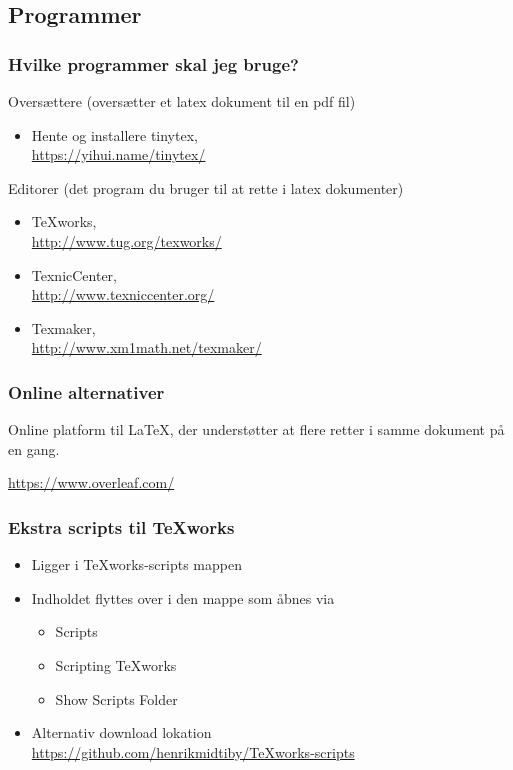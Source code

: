 \documentclass{beamer}
\begin{document}
\subsection{Programmer}
\frame
{
	\frametitle{Hvilke programmer skal jeg bruge?}
	Oversættere (oversætter et latex dokument til en pdf fil)
	\begin{itemize}
		\item Hente og installere tinytex, \\
			{\tiny \url{https://yihui.name/tinytex/}}
	\end{itemize}

	Editorer (det program du bruger til at rette i latex dokumenter)
	\begin{itemize}
		\item	TeXworks, \\
			{\tiny \url{http://www.tug.org/texworks/}}
		\item	TexnicCenter, \\
			{\tiny \url{http://www.texniccenter.org/}}
		\item 	Texmaker, \\
			{\tiny \url{http://www.xm1math.net/texmaker/}}
	\end{itemize}
}


\frame
{
	\frametitle{Online alternativer}

	Online platform til LaTeX, der understøtter at flere retter i samme dokument på en gang.

	\url{https://www.overleaf.com/}
}

\frame
{
	\frametitle{Ekstra scripts til TeXworks}
		
	\begin{itemize}
	\item Ligger i TeXworks-scripts mappen
	\item Indholdet flyttes over i den mappe som åbnes via 
		\begin{itemize}
		\item Scripts 
		\item Scripting TeXworks 
		\item Show Scripts Folder
		\end{itemize}
	\item Alternativ download lokation \\
		{\tiny \url{https://github.com/henrikmidtiby/TeXworks-scripts}}
	\end{itemize}
}
\end{document}
